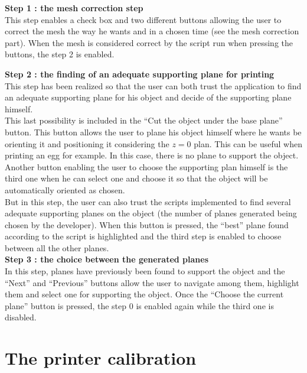 \documentclass{report}
\begin{document}
\textbf{Step 1 : the mesh correction step} \\

This step enables a check box and two different buttons allowing the user to correct the mesh the way he wants and in a chosen time (see the mesh correction part). When the mesh is considered correct by the script run when pressing the buttons, the step 2 is enabled.

\textbf{Step 2 : the finding of an adequate supporting plane for printing}\\

This step has been realized so that the user can both trust the application to find an adequate supporting plane for his object and decide of the supporting plane himself. \\

This last possibility is included in the ``Cut the object under the base plane'' button. This button allows the user to plane his object himself where he wants be orienting it and positioning it considering the $z = 0$ plan. This can be useful when printing an egg for example. In this case, there is no plane to support the object. Another button enabling the user to choose the supporting plan himself is the third one when he can select one and choose it so that the object will be automatically oriented as chosen.\\

But in this step, the user can also trust the scripts implemented to find several adequate supporting planes on the object (the number of planes generated being chosen by the developer). When this button is pressed, the ``best'' plane found according to the script is highlighted and the third step is enabled to choose between all the other planes.\\

\textbf{Step 3 : the choice between the generated planes}\\ 

In this step, planes have previously been found to support the object and the ``Next'' and ``Previous'' buttons allow the user to navigate among them, highlight them and select one for supporting the object. Once the ``Choose the current plane'' button is pressed, the step 0 is enabled again while the third one is disabled. 

\chapter{The printer calibration}
\end{document}

